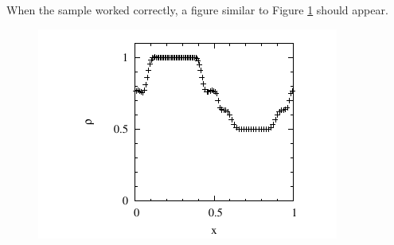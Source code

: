 When the sample worked correctly, a figure similar to Figure \ref{fig:sph} should appear.
\begin{figure}
\begin{center}
\includegraphics[width=0.5\linewidth]{fig/sph.pdf}
\end{center}
\caption{}
\label{fig:sph}
\end{figure}
